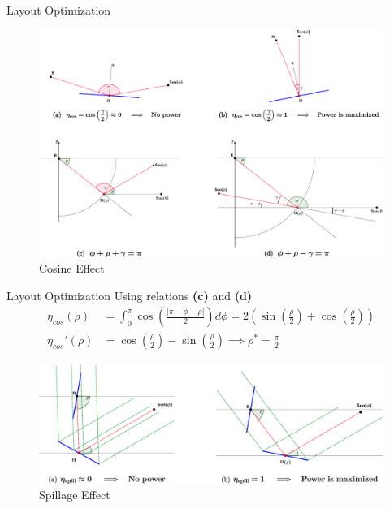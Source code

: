 \documentclass[10pt, xcolor={dvipsnames}]{beamer}
\begin{document}
\begin{frame}{Layout Optimization}
\begin{center}
\begin{figure}
\includegraphics[width=.95\textwidth]{../figures/cos-effect-crop.pdf}
\caption{Cosine Effect}
\end{figure}
\end{center}
\end{frame}

\begin{frame}{Layout Optimization}
Using relations {\bf(c)} and {\bf(d)}
\begin{align*} %
\eta_{cos}(\rho) &= \int_{0}^{\pi} \cos \left( \frac{|\pi - \phi - \rho |}{2} \right) d\phi 
= 2 \left( \sin \left( \frac{\rho}{2} \right) 
+ \cos \left(\frac{\rho}{2}\right)  \right) \\[.5em]
\eta_{cos}'(\rho) &= \cos \left(\frac{\rho}{2}\right) - \sin \left( \frac{\rho}{2} \right) 
\implies \rho^{*} = \frac{\pi}{2}
\end{align*}

\begin{center}
\begin{figure}
\includegraphics[width=.95\textwidth]{../figures/spillage-problem-crop.pdf}
\caption{Spillage Effect}
\end{figure}
\end{center}
\end{frame}
\end{document}

